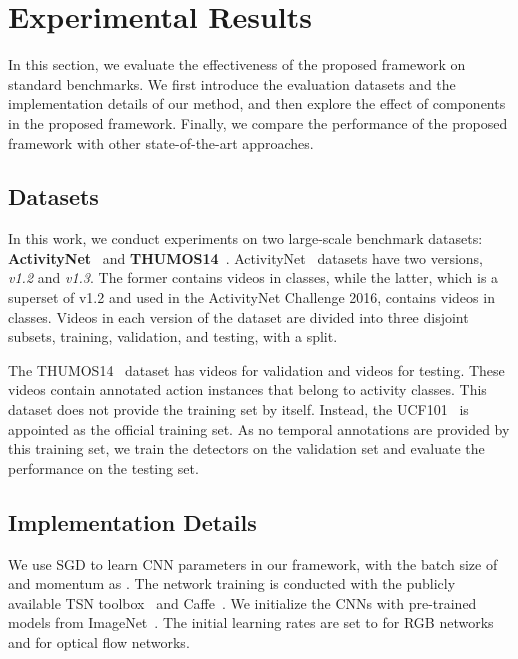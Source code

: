 \documentclass[10pt,twocolumn,letterpaper]{article}
\begin{document}
 
\section{Experimental Results}
\label{sec:experiment}

In this section, we evaluate the effectiveness of the proposed framework on standard benchmarks.
We first introduce the evaluation datasets and the implementation details of our method, 
and then explore the effect of components in the proposed framework.
Finally, we compare the performance of the proposed framework with other state-of-the-art approaches.

\subsection{Datasets}

In this work, we conduct experiments on two large-scale benchmark datasets:
\textbf{ActivityNet}~\cite{caba2015activitynet} and
\textbf{THUMOS14}~\cite{Jiang2014THUMOS14}.
ActivityNet~\cite{caba2015activitynet} datasets have two versions, \emph{v1.2} and \emph{v1.3}.
The former contains  videos in  classes, while the latter, which is a superset of v1.2 and used in the ActivityNet Challenge 2016, contains  videos in  classes.
Videos in each version of the dataset are divided into three disjoint subsets,
training, validation, and testing, with a  split.


The THUMOS14~\cite{Jiang2014THUMOS14} dataset has  videos for validation and  videos for testing.
These videos contain annotated action instances that belong to  activity classes. 
This dataset does not provide the training set by itself.
Instead, the UCF101~\cite{Soomro2012Ucf101} is appointed as the official training set.
As no temporal annotations are provided by this training set, 
we train the detectors on the validation set and evaluate the performance 
on the testing set.


\subsection{Implementation Details}

We use SGD to learn CNN parameters in our framework, with the batch size of  and momentum as .
The network training is conducted with the publicly available TSN toolbox~\cite{Wang2016TSN} and Caffe~\cite{Jia2014Caffe}.
We initialize the CNNs with pre-trained models from ImageNet~\cite{Deng2009ImageNet}.
The initial learning rates are set to  for RGB networks and  for optical flow networks.
\end{document}
